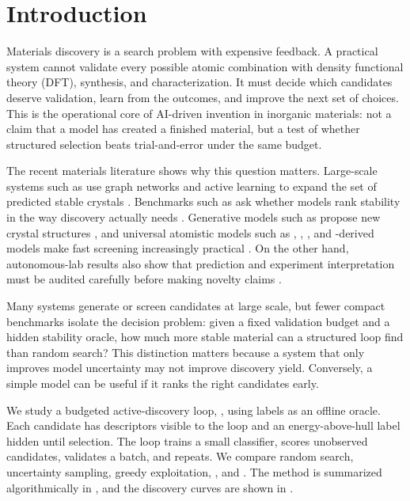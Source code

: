 \section{Introduction}
\label{sec:introduction}

Materials discovery is a search problem with expensive feedback. A practical system cannot validate every possible atomic combination with density functional theory (DFT), synthesis, and characterization. It must decide which candidates deserve validation, learn from the outcomes, and improve the next set of choices. This is the operational core of AI-driven invention in inorganic materials: not a claim that a model has created a finished material, but a test of whether structured selection beats trial-and-error under the same budget.

The recent materials literature shows why this question matters. Large-scale systems such as \gnome use graph networks and active learning to expand the set of predicted stable crystals \cite{merchant2023gnome}. Benchmarks such as \matbench ask whether models rank stability in the way discovery actually needs \cite{riebesell2023matbench}. Generative models such as \mattergen propose new crystal structures \cite{zeni2023mattergen}, and universal atomistic models such as \chgnet, \macemp, \mthreegnet, and \omat-derived models make fast screening increasingly practical \cite{deng2023chgnet,batatia2024foundation,chen2022m3gnet,barroso2024omat24}. On the other hand, autonomous-lab results also show that prediction and experiment interpretation must be audited carefully before making novelty claims \cite{szymanski2023alab,nature2026alabcorrection}.

Many systems generate or screen candidates at large scale, but fewer compact benchmarks isolate the decision problem: given a fixed validation budget and a hidden stability oracle, how much more stable material can a structured loop find than random search? This distinction matters because a system that only improves model uncertainty may not improve discovery yield. Conversely, a simple model can be useful if it ranks the right candidates early.

We study a budgeted active-discovery loop, \methodname, using \mpdata labels as an offline oracle. Each candidate has descriptors visible to the loop and an energy-above-hull label hidden until selection. The loop trains a small \mlp classifier, scores unobserved candidates, validates a batch, and repeats. We compare random search, uncertainty sampling, greedy exploitation, \ucb, and \diverseucb. The method is summarized algorithmically in , and the discovery curves are shown in .

